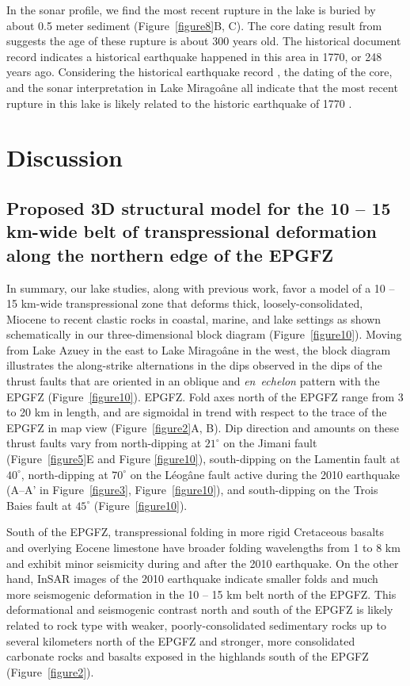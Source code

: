 \documentclass[linenumbers,draft]{agujournal}
\begin{document}
In the sonar profile, we find the most recent rupture in the lake is buried by about 0.5 meter sediment (Figure~\ref{figure8}B, C). The core dating result from \citet{higuera199910} suggests the age of these rupture is about 300 years old. The historical document record \citep{bakun2012significant} indicates a historical earthquake happened in this area in 1770, or 248 years ago. Considering the historical earthquake record \citep{bakun2012significant}, the dating of the core, and the sonar interpretation in Lake Mirago\^ane all indicate that the most recent rupture in this lake is likely related to the historic earthquake of 1770 \citep{bakun2012significant}.

\section{Discussion}
\subsection{Proposed 3D structural model for the 10 -- 15 km-wide belt of transpressional deformation along the northern edge of the EPGFZ}
In summary, our lake studies, along with previous work, favor a model of a 10 -- 15 km-wide transpressional zone that deforms thick, loosely-consolidated, Miocene to recent clastic rocks in coastal, marine, and lake settings as shown schematically in our three-dimensional block diagram (Figure~\ref{figure10}). Moving from Lake Azuey in the east to Lake Mirago\^ane in the west, the block diagram illustrates the along-strike alternations in the dips observed in the dips of the thrust faults that are oriented in an oblique and \textit{en~echelon} pattern with the EPGFZ (Figure~\ref{figure10}). EPGFZ. Fold axes north of the EPGFZ range from 3 to 20 km in length, and are sigmoidal in trend with respect to the trace of the EPGFZ in map view (Figure~\ref{figure2}A, B). Dip direction and amounts on these thrust faults vary from north-dipping at $21^{\circ}$ on the Jimani fault (Figure~\ref{figure5}E and Figure \ref{figure10}), south-dipping on the Lamentin fault \citep{saint2015seismotectonics} at $40^{\circ}$, north-dipping at $70^{\circ}$ on the L\'eog\^ane fault active during the 2010 earthquake (A--A' in Figure~\ref{figure3}, Figure~\ref{figure10}), and south-dipping on the Trois Baies fault at $45^{\circ}$ (Figure~\ref{figure10}). 

South of the EPGFZ, transpressional folding in more rigid Cretaceous basalts and overlying Eocene limestone have broader folding wavelengths from 1 to 8 km and exhibit minor seismicity during and after the 2010 earthquake. On the other hand, InSAR images of the 2010 earthquake indicate smaller folds and much more seismogenic deformation in the 10 -- 15 km belt north of the EPGFZ. This deformational and seismogenic contrast north and south of the EPGFZ is likely related to rock type with weaker, poorly-consolidated sedimentary rocks up to several kilometers north of the EPGFZ and stronger, more consolidated carbonate rocks and basalts exposed in the highlands south of the EPGFZ \citep{mann1991overview} (Figure~\ref{figure2}).
\end{document}
